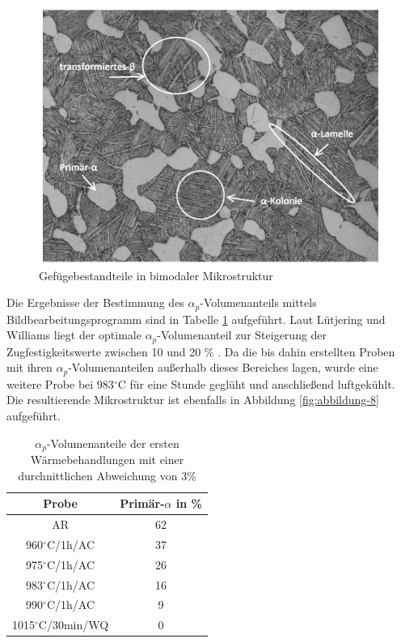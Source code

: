 \begin{figure}[h]
	\centering
	\includegraphics[width=0.9\linewidth]{./Bilder/Abbildung 20}
	\caption[Abbildung 20]{Gefügebestandteile in bimodaler Mikrostruktur}
	\label{fig:abbildung-20}
\end{figure}

Die Ergebnisse der Bestimmung des $\alpha_p$-Volumenanteils mittels Bildbearbeitungsprogramm sind in Tabelle \ref{Tabelle 4} aufgeführt. Laut Lütjering und Williams liegt der optimale $\alpha_p$-Volumenanteil zur Steigerung der Zugfestigkeitswerte zwischen 10 und 20 \% \cite{Lutjering.2007}. Da die bis dahin erstellten Proben mit ihren $\alpha_p$-Volumenanteilen außerhalb dieses Bereiches lagen, wurde eine weitere Probe bei 983$^\circ$C für eine Stunde geglüht und anschließend luftgekühlt. Die resultierende Mikrostruktur ist ebenfalls in Abbildung \ref{fig:abbildung-8} aufgeführt.

\begin{table}[h]
	\centering
	\begin{tabular}{|c|c|}
		\hline 
		Probe & Primär-$\alpha$ in \% \\ 
		\hline 
		AR & 62 \\ 
		\hline 
		960$^\circ$C/1h/AC & 37 \\ 
		\hline 
		975$^\circ$C/1h/AC & 26 \\ 
		\hline 
		983$^\circ$C/1h/AC & 16 \\ 
		\hline 
		990$^\circ$C/1h/AC & 9 \\ 
		\hline 
		1015$^\circ$C/30min/WQ & 0 \\ 
		\hline 
	\end{tabular} 
	\caption{$\alpha_p$-Volumenanteile der ersten Wärmebehandlungen mit einer durchnittlichen Abweichung von 3\%}
	\label{Tabelle 4}
\end{table}

